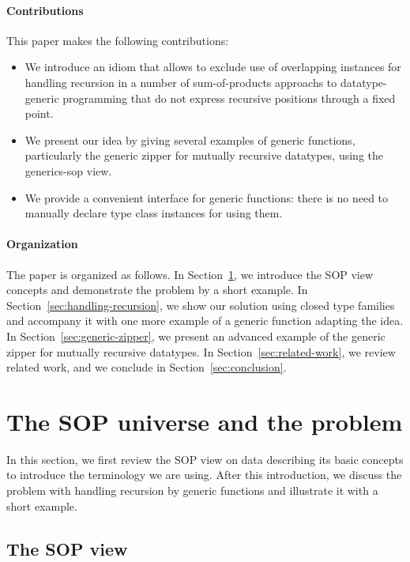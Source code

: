 \documentclass[sigplan,review,anonymous]{acmart}\settopmatter{printfolios=true,printccs=false,printacmref=false}
\begin{document}
\paragraph{Contributions} This paper makes the following contributions:
\begin{itemize}
\item We introduce an idiom that allows to exclude use of overlapping instances for handling recursion in a number of sum-of-products approachs to datatype-generic programming that do not express recursive positions through a fixed point.
\item We present our idea by giving several examples of generic functions, particularly the generic zipper for mutually recursive datatypes, using the \textsf{generics-sop} view.
\item We provide a convenient interface for generic functions: there is no need to manually declare type class instances for using them.
\end{itemize}

\paragraph{Organization} The paper is organized as follows. In Section~\ref{sec:sop-problem}, we introduce the SOP view concepts and demonstrate the problem by a short example. In Section~\ref{sec:handling-recursion}, we show our solution using closed type families and accompany it with one more example of a generic function adapting the idea. In Section~\ref{sec:generic-zipper}, we present an advanced example of the generic zipper for mutually recursive datatypes. In Section~\ref{sec:related-work}, we review related work, and we conclude in Section~\ref{sec:conclusion}.


\section{The SOP universe and the problem}
\label{sec:sop-problem}

In this section, we first review the SOP view on data describing its basic concepts to introduce the terminology we are using. After this introduction, we discuss the problem with handling recursion by generic functions and illustrate it with a short example.

\subsection{The SOP view}
\end{document}
